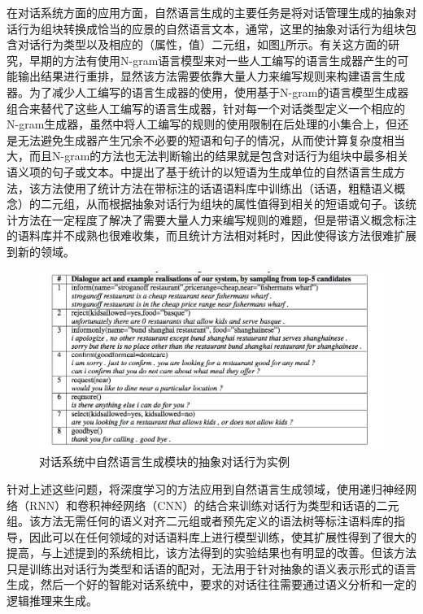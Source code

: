 在对话系统方面的应用方面，自然语言生成的主要任务是将对话管理生成的抽象对话行为组块转换成恰当的应景的自然语言文本，通常，这里的抽象对话行为组块包含对话行为类型以及相应的（属性，值）二元组，如图\ref{fig:NLG-example-litReview}所示\cite{Wen2015}。有关这方面的研究，早期的方法有使用N-gram语言模型来对一些人工编写的语言生成器产生的可能输出结果进行重排\cite{Langkilde1998}，显然该方法需要依靠大量人力来编写规则来构建语言生成器。为了减少人工编写的语言生成器的使用，\cite{Oh2000}使用基于N-gram的语言模型生成器组合来替代了这些人工编写的语言生成器，针对每一个对话类型定义一个相应的N-gram生成器，虽然\cite{Oh2000}中将人工编写的规则的使用限制在后处理的小集合上，但还是无法避免生成器产生冗余不必要的短语和句子的情况，从而使计算复杂度相当大，而且N-gram的方法也无法判断输出的结果就是包含对话行为组块中最多相关语义项的句子或文本。\cite{Mairesse2010, Mairesse2014}中提出了基于统计的以短语为生成单位的自然语言生成方法，该方法使用了统计方法在带标注的话语语料库中训练出（话语，粗糙语义概念）的二元组，从而根据抽象对话行为组块的属性值得到相关的短语或句子。该统计方法在一定程度了解决了需要大量人力来编写规则的难题，但是带语义概念标注的语料库并不成熟也很难收集，而且统计方法相对耗时，因此使得该方法很难扩展到新的领域。

\begin{figure}[htb]
\centering
\includegraphics[width=12cm]{figures/NLG-example-litReview.png}
\caption{对话系统中自然语言生成模块的抽象对话行为实例}
\label{fig:NLG-example-litReview}
\end{figure}

针对上述这些问题，\cite{Wen2015}将深度学习的方法应用到自然语言生成领域，使用递归神经网络（RNN）和卷积神经网络（CNN）的结合来训练对话行为类型和话语的二元组。该方法无需任何的语义对齐二元组或者预先定义的语法树等标注语料库的指导，因此可以在任何领域的对话语料库上进行模型训练，使其扩展性得到了很大的提高，与上述提到的系统相比，该方法得到的实验结果也有明显的改善。但该方法只是训练出对话行为类型和话语的配对，无法用于针对抽象的语义表示形式的语言生成，然后一个好的智能对话系统中，要求的对话往往需要通过语义分析和一定的逻辑推理来生成。

